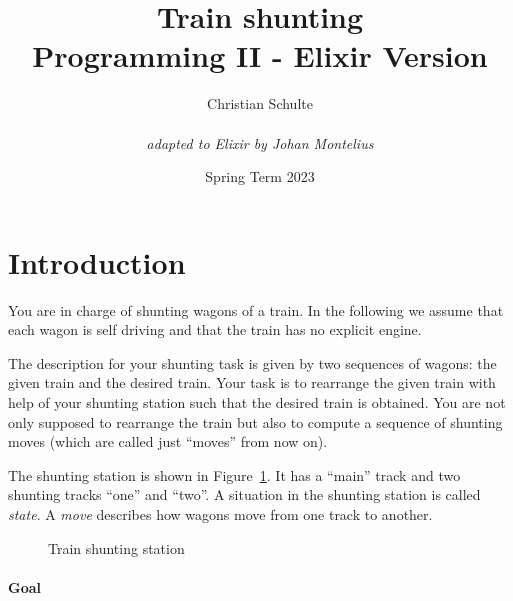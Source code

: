 \documentclass[a4paper,11pt]{article}
\begin{document}
\title{
    \textbf{Train shunting}\\
    \large{Programming II - Elixir Version}
}
\author{Christian Schulte \\ \\ {\em adapted to Elixir by Johan Montelius}}
\date{Spring Term 2023}
\maketitle


\thispagestyle{fancy}

\section*{Introduction}

You are in charge of shunting wagons of a train.  In
the following we assume that each wagon is self driving and that the
train has no explicit engine.

The description for your shunting task is given by two sequences of
wagons: the given train and the desired train. Your task is to
rearrange the given train with help of your shunting station such that
the desired train is obtained. You are not only supposed to rearrange
the train but also to compute a sequence of shunting moves (which are
called just ``moves'' from now on).


The shunting station is shown in Figure~\ref{fig:station}. It has a
``main'' track and two shunting tracks ``one'' and ``two''.  A
situation in the shunting station is called \emph{state}. A
\emph{move} describes how wagons move from one track to another.

\begin{figure}[h]
\begin{center}
\end{center}  
\caption{Train shunting station}
\label{fig:station}
\end{figure}

\paragraph{Goal}
\end{document}
